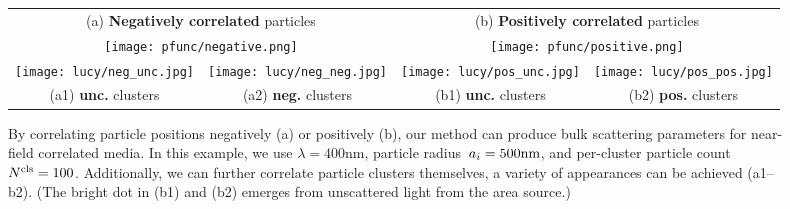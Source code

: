 \begin{figure}
    \centering
    \setlength{\resLen}{0.8in}
    \addtolength{\tabcolsep}{-3.5pt}
    \small
    \begin{tabular}{cc|cc}
        \multicolumn{2}{c|}{(a) \textbf{Negatively correlated} particles} &
        \multicolumn{2}{c}{(b) \textbf{Positively correlated} particles}
        \\
        \multicolumn{2}{c|}{\texttt{[image: pfunc/negative.png]}} & \multicolumn{2}{c}{\texttt{[image: pfunc/positive.png]}} 
        \\
        \texttt{[image: lucy/neg\_unc.jpg]} &
        \texttt{[image: lucy/neg\_neg.jpg]} &
        \texttt{[image: lucy/pos\_unc.jpg]} &
        \texttt{[image: lucy/pos\_pos.jpg]} 
        \\
        (a1) \textbf{unc.} clusters & (a2) \textbf{neg.} clusters & (b1) \textbf{unc.} clusters & (b2) \textbf{pos.} clusters
    \end{tabular}
    \caption{\label{fig:correlated}
        By correlating particle positions negatively (a) or positively (b), our method can produce bulk scattering parameters for near-field correlated media.
        In this example, we use $\lambda = 400\text{nm}$, particle radius~$a_i = 500\text{nm}$, and per-cluster particle count ${N^\text{cls}} = 100$.
        Additionally, we can further correlate particle clusters themselves, a variety of appearances can be achieved (a1--b2).
        (The bright dot in (b1) and (b2) emerges from unscattered light from the area source.)
    }
\end{figure}

